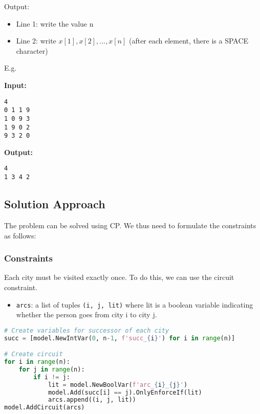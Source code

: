 \documentclass{article}
\begin{document}
Output:
\begin{itemize}
    \item Line 1: write the value n
    \item Line 2: write $x[1], x[2], . . ., x[n]$ (after each element, there is a SPACE character)
\end{itemize}

E.g.
\begin{multicols}{2}
    
    \textbf{Input:}
    \begin{verbatim}
4
0 1 1 9
1 0 9 3
1 9 0 2
9 3 2 0
    \end{verbatim}
\columnbreak
    \textbf{Output:}
    \begin{verbatim}
4
1 3 4 2
    \end{verbatim}
\end{multicols}
\subsection{Solution Approach}
The problem can be solved using CP.
We thus need to formulate the constraints as follows:
\subsubsection{Constraints}
Each city must be visited exactly once. To do this, we can use the circuit constraint.

\begin{itemize}
    \item \verb |arcs|: a list of tuples \verb|(i, j, lit)| where lit is a boolean variable indicating whether the person goes from city i to city j.
\end{itemize}
\pagebreak
\begin{lstlisting}[language=Python]
# Create variables for successor of each city
succ = [model.NewIntVar(0, n-1, f'succ_{i}') for i in range(n)]

# Create circuit
for i in range(n):
    for j in range(n):
        if i != j:
            lit = model.NewBoolVar(f'arc_{i}_{j}')
            model.Add(succ[i] == j).OnlyEnforceIf(lit)
            arcs.append((i, j, lit))
model.AddCircuit(arcs)

\end{lstlisting}
\end{document}
